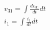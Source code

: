 \begin{eqnarray*}
  v_{31} = \int \frac{dv_{31}}{dt} dt \\
  i_{1} = \int \frac{i_{1}}{dt} dt
\end{eqnarray*}

\endinput
